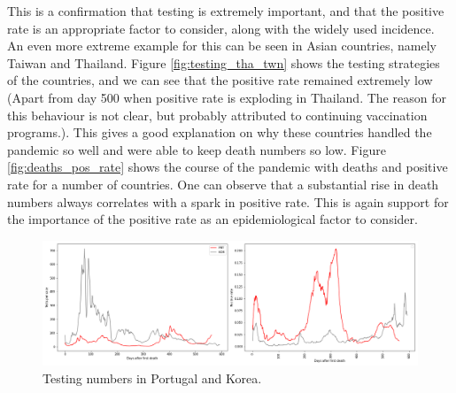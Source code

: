 \documentclass[a4paper,11pt]{article}
\begin{document}
This is a confirmation that testing is extremely important, and that the positive rate is an appropriate factor to consider, along with the widely used incidence. An even more extreme example for this can be seen in Asian countries, namely Taiwan and Thailand. Figure \ref{fig:testing_tha_twn} shows the testing strategies of the countries, and we can see that the positive rate remained extremely low (Apart from day 500 when positive rate is exploding in Thailand. The reason for this behaviour is not clear, but probably attributed to continuing vaccination programs.). This gives a good explanation on why these countries handled the pandemic so well and were able to keep death numbers so low. Figure \ref{fig:deaths_pos_rate} shows the course of the pandemic with deaths and positive rate for a number of countries. One can observe that a substantial rise in death numbers always correlates with a spark in positive rate. This is again support for the importance of the positive rate as an epidemiological factor to consider.


\begin{figure}[htb]
    \centering
    \includegraphics[width=\textwidth]{figures/testing_prt_kor.png}
    \caption{Testing numbers in Portugal and Korea.}
    \label{fig:prt_kor}
\end{figure}
\end{document}
